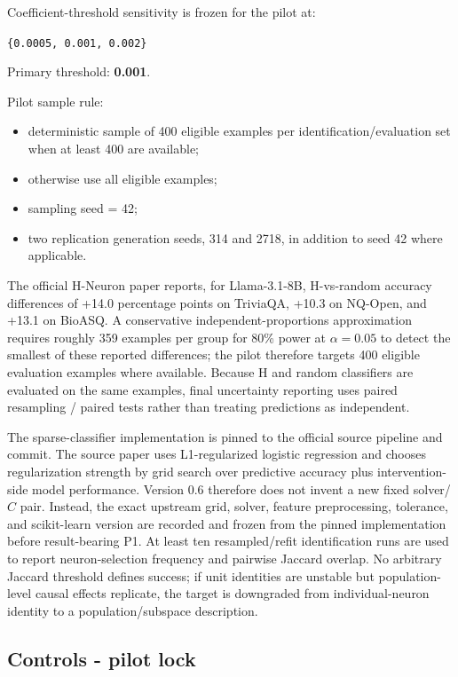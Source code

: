 Coefficient-threshold sensitivity is frozen for the pilot at:

\passthrough{\lstinline!\{0.0005, 0.001, 0.002\}!}

Primary threshold: \textbf{0.001}.

Pilot sample rule:

\begin{itemize}
\tightlist
\item
  deterministic sample of 400 eligible examples per identification/evaluation set when at least 400 are available;
\item
  otherwise use all eligible examples;
\item
  sampling seed = 42;
\item
  two replication generation seeds, 314 and 2718, in addition to seed 42 where applicable.
\end{itemize}

The official H-Neuron paper reports, for Llama-3.1-8B, H-vs-random accuracy differences of +14.0 percentage points on TriviaQA, +10.3 on NQ-Open, and +13.1 on BioASQ. A conservative independent-proportions approximation requires roughly 359 examples per group for 80\% power at $\alpha=0.05$ to detect the smallest of these reported differences; the pilot therefore targets 400 eligible evaluation examples where available. Because H and random classifiers are evaluated on the same examples, final uncertainty reporting uses paired resampling / paired tests rather than treating predictions as independent.

The sparse-classifier implementation is pinned to the official source pipeline and commit. The source paper uses L1-regularized logistic regression and chooses regularization strength by grid search over predictive accuracy plus intervention-side model performance. Version 0.6 therefore does not invent a new fixed solver/$C$ pair. Instead, the exact upstream grid, solver, feature preprocessing, tolerance, and scikit-learn version are recorded and frozen from the pinned implementation before result-bearing P1. At least ten resampled/refit identification runs are used to report neuron-selection frequency and pairwise Jaccard overlap. No arbitrary Jaccard threshold defines success; if unit identities are unstable but population-level causal effects replicate, the target is downgraded from individual-neuron identity to a population/subspace description.

\subsection{Controls - pilot lock}\label{controls---pilot-lock}

